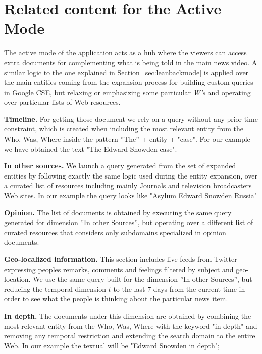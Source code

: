 \documentclass{llncs}
\begin{document}
\section{Related content for the Active Mode}
\label{sec:leanforwardmode}
The active mode of the application acts as a hub where the viewers can access extra documents for complementing what is being told in the main news video. A similar logic to the one explained in Section~\ref{sec:leanbackmode} is applied over the main entities coming from the expansion process for building custom queries in Google CSE, but relaxing or emphasizing some particular \emph{W's} and operating over particular lists of Web resources.

\textbf{Timeline.} For getting those document we rely on a query without any prior time constraint, which is created when including the most relevant entity from the Who, Was, Where inside the pattern ''The'' + entity + "case". For our example we have obtained the text "The Edward Snowden case".

\textbf{In other sources.} We launch a query generated from the set of expanded entities by following exactly the same logic used during the entity expansion, over a curated list of resources including mainly Journals and television broadcasters Web sites. In our example the query looks like "Asylum Edward Snowden Russia"

\textbf{Opinion.} The list of documents is obtained by executing the same query generated for dimension ''In other Sources'', but operating over a different list of curated resources that considers only subdomains specialized in opinion documents.

\textbf{Geo-localized information.} This section includes live feeds from Twitter expressing peoples remarks, comments and feelings filtered by subject and geo-location. We use the same query built for the dimension ''In other Sources'', but reducing the temporal dimension $t$ to the last 7 days from the current time in order to see what the people is thinking about the particular news item.

\textbf{In depth.} The documents under this dimension are obtained by combining the most relevant entity from the Who, Was, Where with the keyword "in depth" and removing any temporal restriction and extending the search domain to the entire Web. In our example the textual will be "Edward Snowden in depth";
		
\end{document}
